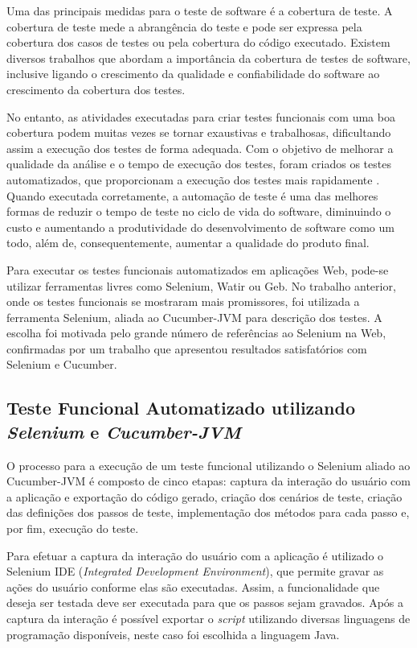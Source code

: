 \documentclass[12pt]{article}
\begin{document}
Uma das principais medidas para o teste de software é a cobertura de teste. A cobertura de teste mede a abrangência do teste e pode ser expressa pela cobertura dos casos de testes ou pela cobertura do código executado. Existem diversos trabalhos que abordam a importância da cobertura de testes de software\cite{zhu1997software,bieman1996using}, inclusive ligando o crescimento da qualidade e confiabilidade do software ao crescimento da cobertura dos testes\cite{malaiya2002software}.


No entanto, as atividades executadas para criar testes funcionais com uma boa cobertura podem muitas vezes se tornar exaustivas e trabalhosas, dificultando assim a execução dos testes de forma adequada. Com o objetivo de melhorar a qualidade da análise e o tempo de execução dos testes, foram criados os testes automatizados, que proporcionam a execução dos testes mais rapidamente \cite{fantinato2005autotest}. Quando executada corretamente, a automação de teste é uma das melhores formas de reduzir o tempo de teste no ciclo de vida do software, diminuindo o custo e aumentando a produtividade do desenvolvimento de software como um todo, além de, consequentemente, aumentar a qualidade do produto final.

Para executar os testes funcionais automatizados em aplicações Web, pode-se utilizar ferramentas livres como Selenium\cite{selenium}, Watir\cite{watir} ou Geb\cite{geb}. No trabalho anterior\cite{sbqs2015}, onde os testes funcionais se mostraram mais promissores, foi utilizada a ferramenta Selenium, aliada ao Cucumber-JVM\cite{cucumber} para descrição dos testes. A escolha foi motivada pelo grande número de referências ao Selenium na Web, confirmadas por um trabalho que apresentou resultados satisfatórios com Selenium e Cucumber\cite{pannutest,sbqs2013}.

\subsection{Teste Funcional Automatizado utilizando \emph{Selenium} e \emph{Cucumber-JVM}}
O processo para a execução de um teste funcional utilizando o Selenium aliado ao Cucumber-JVM é composto de cinco etapas: captura da interação do usuário com a aplicação e exportação do código gerado, criação dos cenários de teste, criação das definições dos passos de teste, implementação dos métodos para cada passo e, por fim, execução do teste.

Para efetuar a captura da interação do usuário com a aplicação é utilizado o Selenium IDE (\emph{Integrated Development Environment}), que permite gravar as ações do usuário conforme elas são executadas. Assim, a funcionalidade que deseja ser testada deve ser executada para que os passos sejam gravados. Após a captura da interação é possível exportar o \emph{script} utilizando diversas linguagens de programação disponíveis, neste caso foi escolhida a linguagem Java.
\end{document}
